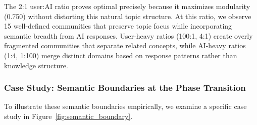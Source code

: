 \documentclass{svproc}
\begin{document}
The 2:1 user:AI ratio proves optimal precisely because it maximizes modularity (0.750) without distorting this natural topic structure. At this ratio, we observe 15 well-defined communities that preserve topic focus while incorporating semantic breadth from AI responses. User-heavy ratios (100:1, 4:1) create overly fragmented communities that separate related concepts, while AI-heavy ratios (1:4, 1:100) merge distinct domains based on response patterns rather than knowledge structure.

\subsubsection{Case Study: Semantic Boundaries at the Phase Transition}

To illustrate these semantic boundaries empirically, we examine a specific case study in Figure~\ref{fig:semantic_boundary}.
\end{document}
